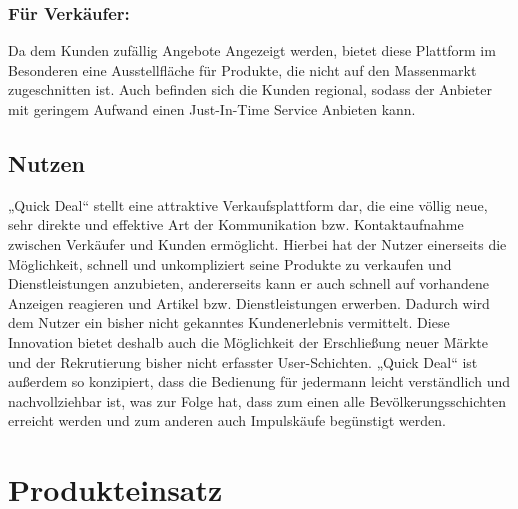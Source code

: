 \documentclass[a4paper,12pt,oneside]{scrartcl}
\begin{document}
\subsubsection*{Für Verkäufer:}
Da dem Kunden zufällig Angebote Angezeigt werden, bietet diese Plattform im Besonderen eine Ausstellfläche für Produkte, die nicht auf den Massenmarkt zugeschnitten ist.
Auch befinden sich die Kunden regional, sodass der Anbieter mit geringem Aufwand einen Just-In-Time Service Anbieten kann.

\subsection{Nutzen}
„Quick Deal“ stellt eine attraktive Verkaufsplattform dar, die eine völlig neue, sehr direkte und effektive Art der Kommunikation bzw. Kontaktaufnahme zwischen Verkäufer und Kunden ermöglicht.
Hierbei hat der Nutzer einerseits die Möglichkeit, schnell und unkompliziert seine Produkte zu verkaufen und Dienstleistungen anzubieten, andererseits kann er auch schnell auf vorhandene Anzeigen reagieren und Artikel bzw. Dienstleistungen erwerben.
Dadurch wird dem Nutzer ein bisher nicht gekanntes Kundenerlebnis vermittelt.
Diese Innovation bietet deshalb auch die Möglichkeit der Erschließung neuer Märkte und der Rekrutierung bisher nicht erfasster User-Schichten.
„Quick Deal“ ist außerdem so konzipiert, dass die Bedienung für jedermann leicht verständlich und nachvollziehbar ist, was zur Folge hat, dass zum einen alle Bevölkerungsschichten erreicht werden und zum anderen auch Impulskäufe begünstigt werden. 





\section{Produkteinsatz}
\end{document}
